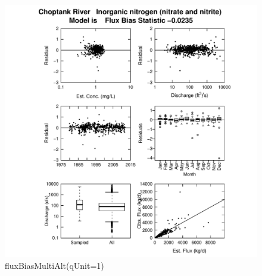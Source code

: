 \documentclass[a4paper,11pt]{article}\usepackage{graphicx, color}
\newenvironment{knitrout}{}{} %
\begin{document}
\begin{knitrout}
\color{fgcolor}\begin{figure}[]

\includegraphics[width=1\linewidth,height=1\linewidth]{figure/fluxBiasMultiAlt} \caption[fluxBiasMultiAlt(qUnit=1)]{fluxBiasMultiAlt(qUnit=1)\label{fig:fluxBiasMultiAlt}}
\end{figure}


\end{knitrout}
\end{document}
